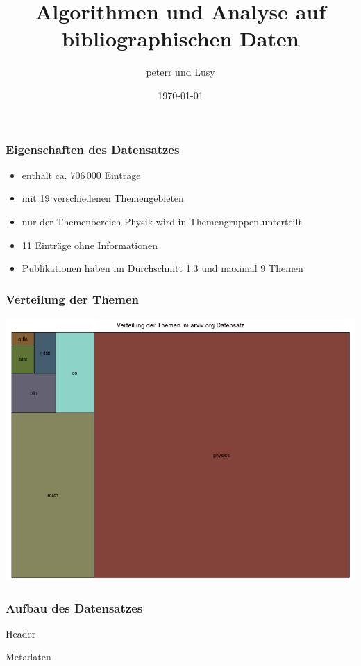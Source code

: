 \documentclass[12pt, xcolor=table]{beamer}
\begin{document}
\title{Algorithmen und Analyse auf bibliographischen Daten}
\author{peterr und Lusy}
\date{\today}

\begin{frame}
	\titlepage
\end{frame}

\begin{frame}
	\frametitle{Eigenschaften des Datensatzes}
	\begin{itemize}
		\item  enthält ca. $706\,000$ Einträge
		\item  mit 19 verschiedenen Themengebieten
		\item  nur der Themenbereich Physik wird in Themengruppen unterteilt
		\item  11 Einträge ohne Informationen
		\item  Publikationen haben im Durchschnitt 1.3 und maximal 9 Themen
	\end{itemize}
\end{frame}

\begin{frame}
	\frametitle{Verteilung der Themen}
	\begin{center}
		\includegraphics[scale=0.35]{../../visual/treeParent2.png}
	\end{center}
\end{frame}
\begin{frame}[fragile]
	\frametitle{Aufbau des Datensatzes}
	\begin{block}{Header}
		
	\end{block}
	\begin{block}{Metadaten}
		
	\end{block}
\end{frame}
\end{document}
